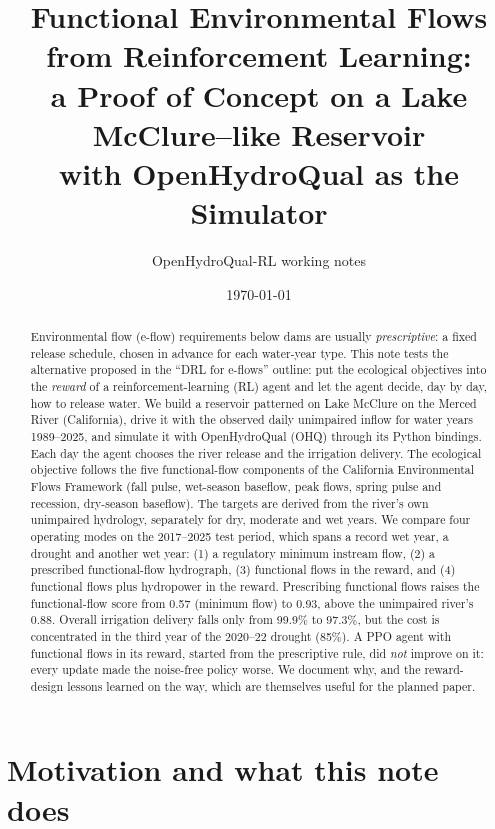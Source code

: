 \documentclass[11pt]{article}
\title{Functional Environmental Flows from Reinforcement Learning:\\
       a Proof of Concept on a Lake McClure--like Reservoir\\
       with OpenHydroQual as the Simulator}
\author{OpenHydroQual-RL working notes}
\date{\today}
\begin{document}
\maketitle

\begin{abstract}
Environmental flow (e-flow) requirements below dams are usually
\emph{prescriptive}: a fixed release schedule, chosen in advance for each
water-year type. This note tests the alternative proposed in the
``DRL for e-flows'' outline: put the ecological objectives into the
\emph{reward} of a reinforcement-learning (RL) agent and let the agent
decide, day by day, how to release water. We build a reservoir patterned
on Lake McClure on the Merced River (California), drive it with the
observed daily unimpaired inflow for water years 1989--2025, and simulate
it with OpenHydroQual (OHQ) through its Python bindings. Each day the agent
chooses the river release and the irrigation delivery. The ecological
objective follows the five functional-flow components of the California
Environmental Flows Framework (fall pulse, wet-season baseflow, peak
flows, spring pulse and recession, dry-season baseflow). The targets are
derived from the river's own unimpaired hydrology, separately for dry,
moderate and wet years. We compare four operating modes on the 2017--2025
test period, which spans a record wet year, a drought and another wet year:
(1) a regulatory minimum instream flow, (2) a prescribed functional-flow
hydrograph, (3) functional flows in the reward, and (4) functional flows plus hydropower in the reward. Prescribing functional
flows raises the functional-flow score from 0.57 (minimum flow) to 0.93,
above the unimpaired river's 0.88. Overall irrigation delivery falls only
from 99.9\% to 97.3\%, but the cost is concentrated in the third year of
the 2020--22 drought (85\%). A PPO agent with functional flows in its
reward, started from the prescriptive rule, did \emph{not} improve on it:
every update made the noise-free policy worse. We document why, and the
reward-design lessons learned on the way, which are themselves useful for
the planned paper.
\end{abstract}

\tableofcontents
\newpage

\section{Motivation and what this note does}
\label{sec:intro}
\end{document}
